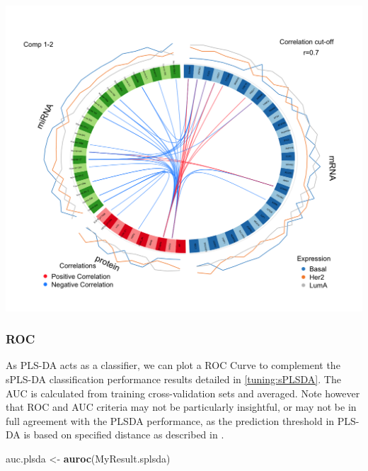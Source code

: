 \documentclass[]{book}
\newenvironment{Shaded}{\begin{snugshade}}{\end{snugshade}}
\newcommand{\KeywordTok}[1]{\textcolor[rgb]{0.13,0.29,0.53}{\textbf{#1}}}
\newcommand{\DataTypeTok}[1]{\textcolor[rgb]{0.13,0.29,0.53}{#1}}
\newcommand{\DecValTok}[1]{\textcolor[rgb]{0.00,0.00,0.81}{#1}}
\newcommand{\StringTok}[1]{\textcolor[rgb]{0.31,0.60,0.02}{#1}}
\newcommand{\OtherTok}[1]{\textcolor[rgb]{0.56,0.35,0.01}{#1}}
\newcommand{\OperatorTok}[1]{\textcolor[rgb]{0.81,0.36,0.00}{\textbf{#1}}}
\newcommand{\NormalTok}[1]{#1}
\theoremstyle{definition}
\theoremstyle{definition}
\theoremstyle{definition}
\theoremstyle{remark}
\begin{document}
\begin{Shaded}
\end{Shaded}

\begin{center}\includegraphics[width=0.5\linewidth]{Figures/unnamed-chunk-7-1} \end{center}

\subsubsection{ROC}\label{roc}

As PLS-DA acts as a classifier, we can plot a ROC Curve to complement
the sPLS-DA classification performance results detailed in
\ref{tuning:sPLSDA}. The AUC is calculated from training
cross-validation sets and averaged. Note however that ROC and AUC
criteria may not be particularly insightful, or may not be in full
agreement with the PLSDA performance, as the prediction threshold in
PLS-DA is based on specified distance as described in \citep{mixomics}.

\begin{Shaded}
\begin{Highlighting}[]
\NormalTok{auc.plsda <-}\StringTok{ }\KeywordTok{auroc}\NormalTok{(MyResult.splsda)}
\end{Highlighting}
\end{Shaded}
\end{document}
